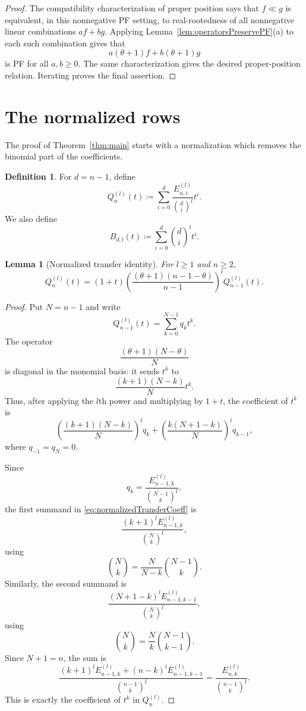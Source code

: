 \documentclass[reqno]{amsart}
\numberwithin{equation}{section}
\newtheorem{lemma}[theorem]{Lemma}
\theoremstyle{definition}
\newtheorem{definition}[theorem]{Definition}
\begin{document}
\begin{proof}
The compatibility characterization of proper position says that
$f\ll g$ is equivalent, in this nonnegative PF setting, to real-rootedness of
all nonnegative linear combinations $af+bg$.  Applying
Lemma~\ref{lem:operatorsPreservePF}(a) to each such combination gives that
\[
  a(\theta+1)f+b(\theta+1)g
\]
is PF for all $a,b\geq 0$.  The same characterization gives the desired
proper-position relation.  Iterating proves the final assertion.
\end{proof}

\section{The normalized rows}
\label{sec:normalizedRows}

The proof of Theorem~\ref{thm:main} starts with a normalization which removes
the binomial part of the coefficients.

\begin{definition}
\label{def:normalizedRows}
For $d=n-1$, define
\[
  Q_n^{(l)}(t)
  \coloneqq
  \sum_{i=0}^{d}
  \frac{E_{n,i}^{(l)}}{\binom di^l}t^i .
\]
We also define
\[
  B_{d,l}(t)\coloneqq \sum_{i=0}^{d}\binom di^l t^i .
\]
\end{definition}

\begin{lemma}[Normalized transfer identity]
\label{lem:normalizedTransfer}
For $l\geq 1$ and $n\geq 2$,
\[
  Q_n^{(l)}(t)
  =
  (1+t)
  \left(
    \frac{(\theta+1)(n-1-\theta)}{n-1}
  \right)^l
  Q_{n-1}^{(l)}(t).
\]
\end{lemma}

\begin{proof}
Put $N=n-1$ and write
\[
  Q_{n-1}^{(l)}(t)=\sum_{k=0}^{N-1}q_kt^k .
\]
The operator
\[
  \frac{(\theta+1)(N-\theta)}{N}
\]
is diagonal in the monomial basis: it sends $t^k$ to
\[
  \frac{(k+1)(N-k)}{N}t^k .
\]
Thus, after applying the $l$th power and multiplying by $1+t$, the coefficient
of $t^k$ is
\begin{equation}
\label{eq:normalizedTransferCoeff}
  \left(\frac{(k+1)(N-k)}{N}\right)^l q_k
  +
  \left(\frac{k(N+1-k)}{N}\right)^l q_{k-1},
\end{equation}
where $q_{-1}=q_N=0$.

Since
\[
  q_k=\frac{E_{n-1,k}^{(l)}}{\binom{N-1}{k}^l},
\]
the first summand in \eqref{eq:normalizedTransferCoeff} is
\[
  \frac{(k+1)^lE_{n-1,k}^{(l)}}{\binom Nk^l},
\]
using
\[
  \binom Nk=\frac{N}{N-k}\binom{N-1}{k}.
\]
Similarly, the second summand is
\[
  \frac{(N+1-k)^lE_{n-1,k-1}^{(l)}}{\binom Nk^l},
\]
using
\[
  \binom Nk=\frac{N}{k}\binom{N-1}{k-1}.
\]
Since $N+1=n$, the sum is
\[
  \frac{
    (k+1)^lE_{n-1,k}^{(l)}
    +(n-k)^lE_{n-1,k-1}^{(l)}
  }{\binom{n-1}{k}^l}
  =
  \frac{E_{n,k}^{(l)}}{\binom{n-1}{k}^l}.
\]
This is exactly the coefficient of $t^k$ in $Q_n^{(l)}$.
\end{proof}
\end{document}
